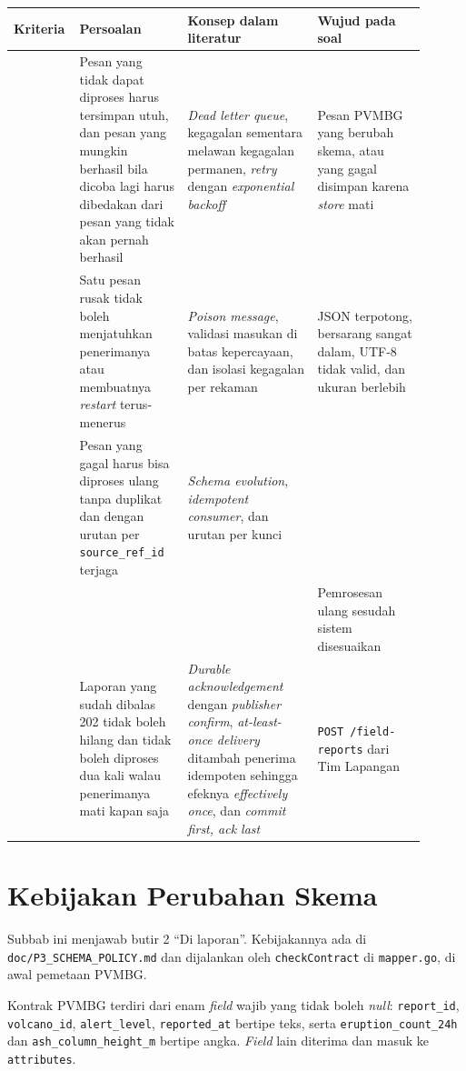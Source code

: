 \begin{longtable}[]{|>{\raggedright\arraybackslash}p{0.1\linewidth}|>{\raggedright\arraybackslash}p{0.25\linewidth}|>{\raggedright\arraybackslash}p{0.3\linewidth}|>{\raggedright\arraybackslash}p{0.25\linewidth}|}
\hline
\textbf{Kriteria} & \textbf{Persoalan} & \textbf{Konsep dalam literatur} & \textbf{Wujud pada soal} \\
\hline
\endhead
2 & Pesan yang tidak dapat diproses harus tersimpan utuh, dan pesan yang mungkin berhasil bila dicoba lagi harus dibedakan dari pesan yang tidak akan pernah berhasil & \textit{Dead letter queue}, kegagalan sementara melawan kegagalan permanen, \textit{retry} dengan \textit{exponential backoff} & Pesan PVMBG yang berubah skema, atau yang gagal disimpan karena \textit{store} mati \\
\hline
3 & Satu pesan rusak tidak boleh menjatuhkan penerimanya atau membuatnya \textit{restart} terus-menerus & \textit{Poison message}, validasi masukan di batas kepercayaan, dan isolasi kegagalan per rekaman & JSON terpotong, bersarang sangat dalam, UTF-8 tidak valid, dan ukuran berlebih \\
\hline
4 & Pesan yang gagal harus bisa diproses ulang tanpa duplikat dan dengan urutan per \texttt{source\_ref\_id} terjaga & \textit{Schema evolution}, \textit{idempotent consumer}, dan urutan per kunci \\
& & & Pemrosesan ulang sesudah sistem disesuaikan \\
\hline
6 & Laporan yang sudah dibalas 202 tidak boleh hilang dan tidak boleh diproses dua kali walau penerimanya mati kapan saja & \textit{Durable acknowledgement} dengan \textit{publisher confirm}, \textit{at-least-once delivery} ditambah penerima idempoten sehingga efeknya \textit{effectively once}, dan \textit{commit first, ack last} & \texttt{POST /field-reports} dari Tim Lapangan \\
\hline
\end{longtable}

\section{Kebijakan Perubahan Skema}

Subbab ini menjawab butir 2 ``Di laporan''. Kebijakannya ada di \texttt{doc/P3\_SCHEMA\_POLICY.md} dan dijalankan oleh \texttt{checkContract} di \texttt{mapper.go}, di awal pemetaan PVMBG.

Kontrak PVMBG terdiri dari enam \textit{field} wajib yang tidak boleh \textit{null}: \texttt{report\_id}, \texttt{volcano\_id}, \texttt{alert\_level}, \texttt{reported\_at} bertipe teks, serta \texttt{eruption\_count\_24h} dan \texttt{ash\_column\_height\_m} bertipe angka. \textit{Field} lain diterima dan masuk ke \texttt{attributes}.

